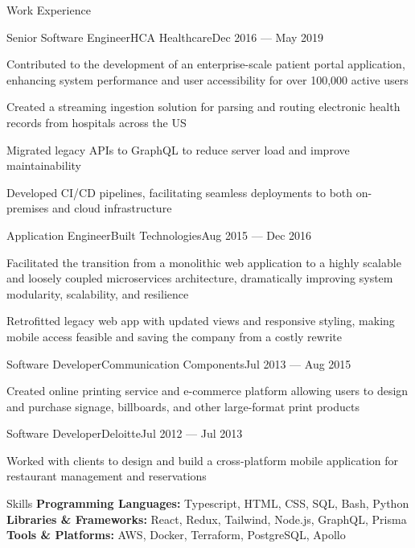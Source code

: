 \documentclass{resume} %
\begin{document}
\begin{rSection}{Work Experience}
\begin{rWorkHistoryItem}{Senior Software Engineer}{HCA Healthcare}{Dec 2016 --- May 2019}
          \item Contributed to the development of an enterprise-scale patient portal application, enhancing system performance and user accessibility for over 100,000 active users
          \item Created a streaming ingestion solution for parsing and routing electronic health records from hospitals across the US
          \item Migrated legacy APIs to GraphQL to reduce server load and improve maintainability
          \item Developed CI/CD pipelines, facilitating seamless deployments to both on-premises and cloud infrastructure
      \end{rWorkHistoryItem}
      \begin{rWorkHistoryItem}{Application Engineer}{Built Technologies}{Aug 2015 --- Dec 2016}
          \item Facilitated the transition from a monolithic web application to a highly scalable and loosely coupled microservices architecture, dramatically improving system modularity, scalability, and resilience
          \item Retrofitted legacy web app with updated views and responsive styling, making mobile access feasible and saving the company from a costly rewrite
      \end{rWorkHistoryItem}
      \begin{rWorkHistoryItem}{Software Developer}{Communication Components}{Jul 2013 --- Aug 2015}
          \item Created online printing service and e-commerce platform allowing users to design and purchase signage, billboards, and other large-format print products
      \end{rWorkHistoryItem}
      \begin{rWorkHistoryItem}{Software Developer}{Deloitte}{Jul 2012 --- Jul 2013}
          \item Worked with clients to design and build a cross-platform mobile application for restaurant management and reservations
      \end{rWorkHistoryItem}

  \end{rSection}


  \begin{rSection}{Skills}
      \textbf{Programming Languages:} \hfill Typescript, HTML, CSS, SQL, Bash, Python \\[0.25em]
      \textbf{Libraries \& Frameworks:} \hfill React, Redux, Tailwind, Node.js, GraphQL, Prisma \\[0.25em]
      \textbf{Tools \& Platforms:} \hfill AWS, Docker, Terraform, PostgreSQL, Apollo \\[0.25em]
  \end{rSection}
\vspace{0.25em}
\end{document}
